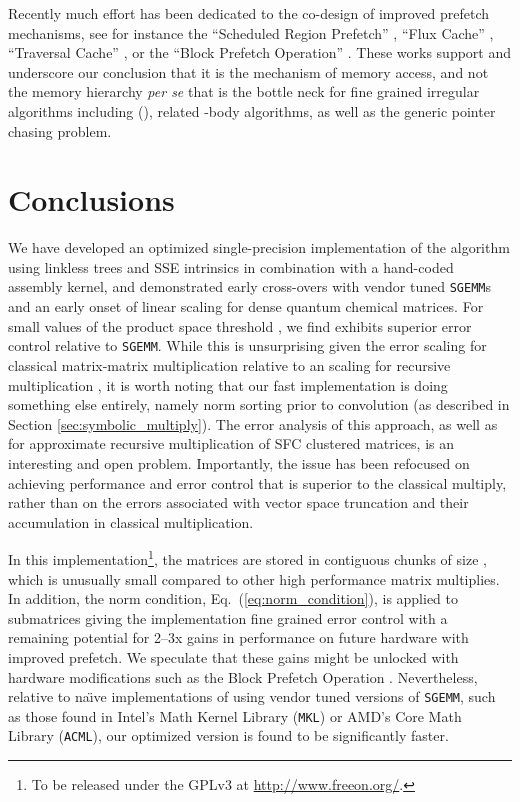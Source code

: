 Recently much effort has been dedicated to the co-design of improved prefetch
mechanisms, see for instance the ``Scheduled Region Prefetch''
\cite{lin2001reducing, wang2003guided}, ``Flux Cache''
\cite{gaydadjiev2006sad}, ``Traversal Cache'' \cite{stitt2008traversal}, or
the ``Block Prefetch Operation'' \cite{karlsson2000prefetching}.  These works
support and underscore our conclusion that it is the mechanism of memory
access, and not the memory hierarchy \emph{per se} that is the bottle neck for
fine grained irregular algorithms including \SpAMM{}(), related
-body algorithms, as well as the generic pointer chasing problem.

\section{Conclusions}
\label{sec:conclusions}

We have developed an optimized single-precision implementation of the \SpAMM{}
algorithm using linkless trees and SSE intrinsics in combination with a
hand-coded assembly kernel, and demonstrated early cross-overs with vendor
tuned {\tt SGEMM}s and an early onset of linear scaling for dense quantum
chemical matrices.  For small values of the product space threshold , we
find \SpAMM{} exhibits superior error control relative to {\tt SGEMM}.  While
this is unsurprising given the  error
scaling for classical matrix-matrix multiplication relative to an  scaling for recursive multiplication
\cite{Bini:1980:FastMM}, it is worth noting that our fast implementation is
doing something else entirely, namely norm sorting prior to convolution (as
described in Section \ref{sec:symbolic_multiply}). The error analysis of this
approach, as well as for approximate recursive multiplication of SFC clustered
matrices, is an interesting and open problem.  Importantly, the issue has been
refocused on achieving performance and error control that is superior to the
classical multiply, rather than on the errors associated with vector space
truncation and their accumulation in classical multiplication.

In this implementation\footnote{To be released under the GPLv3 at
\url{http://www.freeon.org/}.}, the matrices are stored in contiguous chunks
of size , which is unusually small compared to other high
performance matrix multiplies. In addition, the norm condition,
Eq.~(\ref{eq:norm_condition}), is applied to  submatrices giving
the implementation fine grained error control with a remaining potential for
2--3x gains in performance on future hardware with improved prefetch.  We
speculate that these gains might be unlocked with hardware modifications such
as the Block Prefetch Operation \cite{karlsson2000prefetching}.  Nevertheless,
relative to na\"{\i}ve implementations of \SpAMM{} using vendor tuned versions
of {\tt SGEMM}, such as those found in Intel's Math Kernel Library ({\tt MKL})
or AMD's Core Math Library ({\tt ACML}), our optimized version is found to be
significantly faster.

